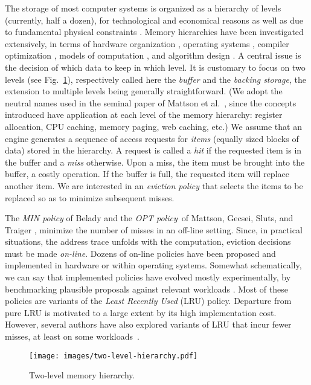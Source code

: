 \documentclass[11pt,a4paper]{article}
\theoremstyle{definition}
\theoremstyle{remark}
\begin{document}
The storage of most computer systems is organized as a hierarchy of
levels (currently, half a dozen), for technological and economical
reasons \cite{HennessyP06} as well as due to fundamental physical
constraints \cite{BilardiP95}. Memory hierarchies have been
investigated extensively, in terms of hardware organization
\cite{Fotheringham61,Przybylski90,HennessyP06}, operating systems
\cite{SilberschatzGG05}, compiler optimization
\cite{AllenK02,Wolfe95,GuoGP03}, models of computation
\cite{Savage97}, and algorithm design \cite{AggarwalACS87}.  A central
issue is the decision of which data to keep in which level.  It is
customary to focus on two levels (see Fig.~\ref{two-lev-hier}),
respectively called here the \emph{buffer} and the \emph{backing
  storage}, the extension to multiple levels being generally
straightforward. (We adopt the neutral names used in the seminal paper
of Mattson et al.\ \cite{MattsonGST70}, since the concepts introduced
have application at each level of the memory hierarchy: register
allocation, CPU caching, memory paging, web caching, etc.) We assume
that an engine generates a sequence of access requests  for \emph{items} (equally sized blocks of data)
stored in the hierarchy.  A request is called a \emph{hit} if the
requested item is in the buffer and a \emph{miss} otherwise. Upon a
miss, the item must be brought into the buffer, a costly operation.
If the buffer is full, the requested item will replace another
item. We are interested in an \emph{eviction policy} that selects the
items to be replaced so as to minimize subsequent misses.

The \emph{MIN policy} of Belady \cite{Belady66} and the \emph{OPT
  policy}\footnotemark\ of Mattson, Gecsei, Sluts, and Traiger
\cite{MattsonGST70}, minimize the number of misses in an off-line
setting.  Since, in
practical situations, the address trace unfolds with the computation, eviction
decisions must be made \emph{on-line}.  Dozens of on-line policies have been
proposed and implemented in hardware or within operating systems.
Somewhat schematically, we can say that implemented policies have evolved mostly
experimentally, by benchmarking plausible proposals against relevant workloads
\cite{Przybylski90}.  Most of these policies are variants of the \emph{Least
  Recently Used} (LRU) policy. Departure from pure LRU is motivated to a large
extent by its high implementation cost.  However, several authors have also
explored variants of LRU that incur fewer misses, at least on some
workloads~\cite{MegiddoM04}.
\begin{figure}
  \centering  \texttt{[image: images/two-level-hierarchy.pdf]}
  \caption{Two-level memory hierarchy.}
  \label{two-lev-hier}
\end{figure}
\end{document}
